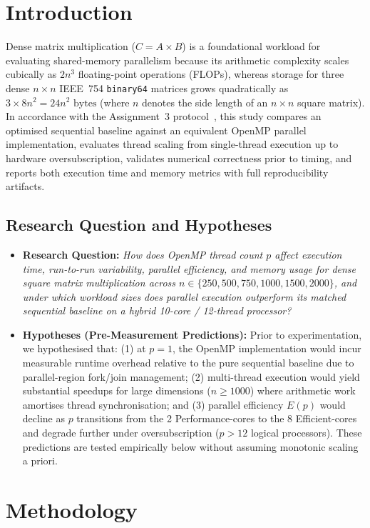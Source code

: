 \documentclass[11pt,a4paper]{article}
\begin{document}
\section{Introduction}
Dense matrix multiplication ($C = A \times B$) is a foundational workload for evaluating shared-memory parallelism because its arithmetic complexity scales cubically as $2n^3$ floating-point operations (FLOPs), whereas storage for three dense $n \times n$ IEEE~754 \texttt{binary64} matrices grows quadratically as $3 \times 8n^2 = 24n^2\text{ bytes}$ (where $n$ denotes the side length of an $n \times n$ square matrix). In accordance with the Assignment~3 protocol~\cite{courseproposal}, this study compares an optimised sequential baseline against an equivalent OpenMP parallel implementation, evaluates thread scaling from single-thread execution up to hardware oversubscription, validates numerical correctness prior to timing, and reports both execution time and memory metrics with full reproducibility artifacts.

\subsection{Research Question and Hypotheses}
\begin{itemize}
    \item \textbf{Research Question:} \emph{How does OpenMP thread count $p$ affect execution time, run-to-run variability, parallel efficiency, and memory usage for dense square matrix multiplication across $n \in \{250, 500, 750, 1000, 1500, 2000\}$, and under which workload sizes does parallel execution outperform its matched sequential baseline on a hybrid 10-core / 12-thread processor?}
    \item \textbf{Hypotheses (Pre-Measurement Predictions):} Prior to experimentation, we hypothesised that: (1) at $p=1$, the OpenMP implementation would incur measurable runtime overhead relative to the pure sequential baseline due to parallel-region fork/join management; (2) multi-thread execution would yield substantial speedups for large dimensions ($n \ge 1000$) where arithmetic work amortises thread synchronisation; and (3) parallel efficiency $E(p)$ would decline as $p$ transitions from the 2 Performance-cores to the 8 Efficient-cores and degrade further under oversubscription ($p > 12$ logical processors). These predictions are tested empirically below without assuming monotonic scaling a priori.
\end{itemize}

\section{Methodology}
\end{document}
